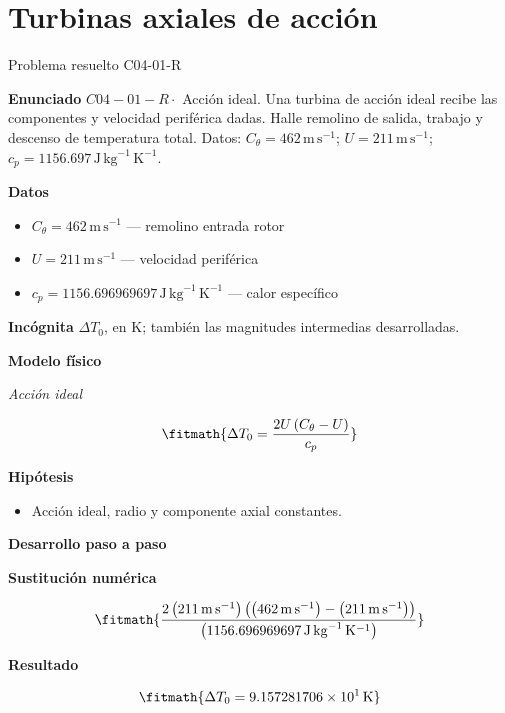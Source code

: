 \documentclass[10pt,openany]{book}
\begin{document}
\chapter{Turbinas axiales de acción}
\begin{studiumworked}{Problema resuelto C04-01-R}


\noindent\textbf{Enunciado}
\(C04-01-R \cdot\) Acción ideal. Una turbina de acción ideal recibe las componentes y velocidad periférica dadas. Halle remolino de salida, trabajo y descenso de temperatura total. Datos: \(C_\theta=462\, \mathrm{m}\,\mathrm{s}^{-1}\); \(U=211\, \mathrm{m}\,\mathrm{s}^{-1}\); \(c_p=1156.697\, \mathrm{J}\,\mathrm{kg}^{-1}\,\mathrm{K}^{-1}\).

\noindent\textbf{Datos}
\begin{itemize}
\item $C_\theta = 462\,\mathrm{m}\,\mathrm{s}^{-1}$ — remolino entrada rotor
\item $U = 211\,\mathrm{m}\,\mathrm{s}^{-1}$ — velocidad periférica
\item $c_p = 1156.696969697\,\mathrm{J}\,\mathrm{kg}^{-1}\,\mathrm{K}^{-1}$ — calor específico
\end{itemize}

\noindent\textbf{Incógnita}
$\Delta T_0$, en $\mathrm{K}$; también las magnitudes intermedias desarrolladas.

\noindent\textbf{Modelo físico}

\noindent\textit{Acción ideal}

\[
\fitmath{\Delta T_0=\frac{2 U \left(C_\theta - U\right)}{c_p}}
\]

\noindent\textbf{Hipótesis}
\begin{itemize}
\item Acción ideal, radio y componente axial constantes.
\end{itemize}

\noindent\textbf{Desarrollo paso a paso}



\noindent\textbf{Sustitución numérica}

\[
\fitmath{\frac{2 \left(211\,\mathrm{m}\,\mathrm{s}^{-1}\right) \left(\left(462\,\mathrm{m}\,\mathrm{s}^{-1}\right) - \left(211\,\mathrm{m}\,\mathrm{s}^{-1}\right)\right)}{\left(1156.696969697\,\mathrm{J}\,\mathrm{kg}^{-1}\,\mathrm{K}^{-1}\right)}}
\]

\noindent\textbf{Resultado}

\[
\fitmath{\Delta T_0=9.157281706\times10^{1}\,\mathrm{K}}
\]


\end{studiumworked}
\end{document}
